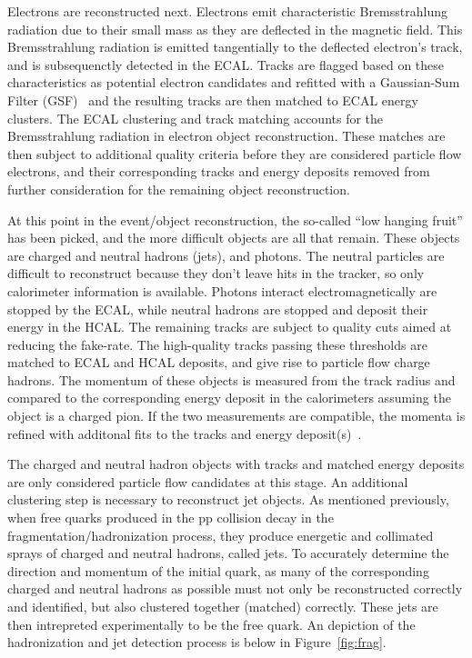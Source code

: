 Electrons are reconstructed next. Electrons emit characteristic Bremsstrahlung radiation due to their small mass as they are deflected in the magnetic field.
This Bremsstrahlung radiation is emitted tangentially to the deflected electron's track, and is subsequenctly detected in the ECAL. 
Tracks are flagged based on these characteristics as potential electron candidates and refitted with a Gaussian-Sum Filter (GSF)~\cite{gsf} and the
resulting tracks are then matched to ECAL energy clusters. The ECAL clustering and track matching accounts for the Bremsstrahlung radiation in electron object reconstruction.
These matches are then subject to additional quality criteria before they are considered particle flow electrons, and their
corresponding tracks and energy deposits removed from further consideration for the remaining object reconstruction. 

At this point in the event/object reconstruction, the so-called ``low hanging fruit'' has been picked, and the more difficult objects are all that remain. These objects are charged
and neutral hadrons (jets), and photons. The neutral particles are difficult to reconstruct because they don't leave hits in the tracker, so only calorimeter information is
available. Photons interact electromagnetically are stopped by the ECAL, while neutral hadrons are stopped and deposit their energy in the HCAL.
The remaining tracks are subject to
quality cuts aimed at reducing the fake-rate. The high-quality tracks passing these thresholds are matched to ECAL and HCAL deposits, and give rise to particle flow 
charge hadrons. The momentum of these objects is measured from the track radius and compared to the corresponding energy deposit in the calorimeters assuming the object is
a charged pion. If the two measurements are compatible, the momenta is refined with additonal fits to the tracks and energy deposit(s)~\cite{CMS-PFT-09-001}.

The charged and neutral hadron objects with tracks and matched energy deposits are only considered particle flow candidates at this stage.
An additional clustering step is necessary to reconstruct jet objects. As mentioned previously, when free quarks produced in the pp collision decay in the
fragmentation/hadronization process, they produce energetic and collimated sprays of charged
and neutral hadrons, called jets. To accurately determine the direction and momentum of the initial quark, as many of the corresponding charged and neutral hadrons as possible must not only be
reconstructed correctly and identified, but also clustered together (matched) correctly.
These jets are then intrepreted experimentally to be the free quark. An depiction of the hadronization and jet detection process is below in Figure~\ref{fig:frag}.

